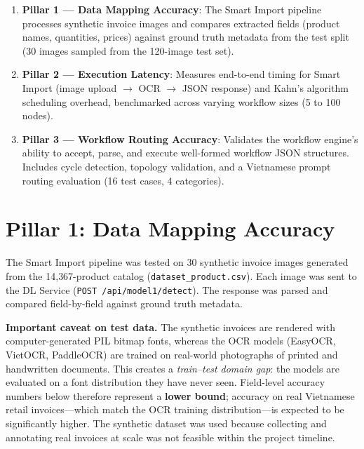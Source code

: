 \documentclass[11pt,a4paper]{report}
\begin{document}
\begin{enumerate}
  \item \textbf{Pillar 1 --- Data Mapping Accuracy}: The Smart Import pipeline processes synthetic invoice images and compares extracted fields (product names, quantities, prices) against ground truth metadata from the test split (30 images sampled from the 120-image test set).
  \item \textbf{Pillar 2 --- Execution Latency}: Measures end-to-end timing for Smart Import (image upload $\to$ OCR $\to$ JSON response) and Kahn's algorithm scheduling overhead, benchmarked across varying workflow sizes (5 to 100 nodes).
  \item \textbf{Pillar 3 --- Workflow Routing Accuracy}: Validates the workflow engine's ability to accept, parse, and execute well-formed workflow JSON structures. Includes cycle detection, topology validation, and a Vietnamese prompt routing evaluation (16 test cases, 4 categories).
\end{enumerate}

\section{Pillar 1: Data Mapping Accuracy}

The Smart Import pipeline was tested on 30 synthetic invoice images generated from the 14{,}367-product catalog (\texttt{dataset\_product.csv}). Each image was sent to the DL Service (\texttt{POST /api/model1/detect}). The response was parsed and compared field-by-field against ground truth metadata.

\textbf{Important caveat on test data.} The synthetic invoices are rendered with computer-generated PIL bitmap fonts, whereas the OCR models (EasyOCR, VietOCR, PaddleOCR) are trained on real-world photographs of printed and handwritten documents. This creates a \emph{train--test domain gap}: the models are evaluated on a font distribution they have never seen. Field-level accuracy numbers below therefore represent a \textbf{lower bound}; accuracy on real Vietnamese retail invoices---which match the OCR training distribution---is expected to be significantly higher. The synthetic dataset was used because collecting and annotating real invoices at scale was not feasible within the project timeline.
\end{document}
